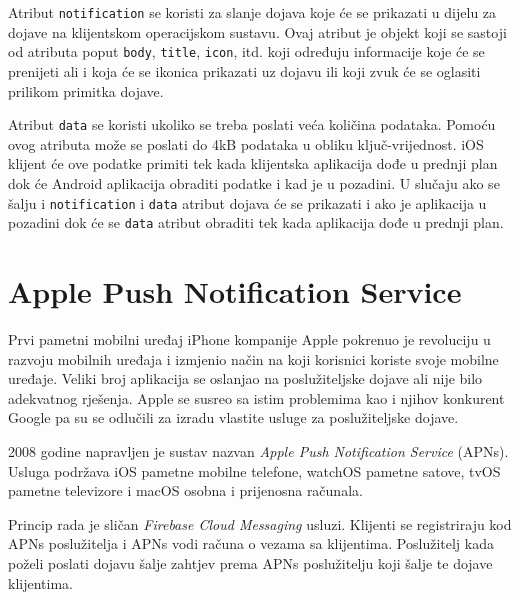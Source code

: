\documentclass[times, utf8, zavrsni]{fer}
\begin{document}
{Atribut {\tt notification} se koristi za slanje dojava koje će se prikazati u dijelu za dojave na klijentskom operacijskom sustavu. Ovaj atribut je objekt koji se sastoji od atributa poput {\tt body}, {\tt title}, {\tt icon}, itd. koji određuju informacije koje će se prenijeti ali i koja će se ikonica prikazati uz dojavu ili koji zvuk će se oglasiti prilikom primitka dojave.

Atribut {\tt data} se koristi ukoliko se treba poslati veća količina podataka. Pomoću ovog atributa može se poslati do 4kB podataka u obliku ključ-vrijednost. iOS klijent će ove podatke primiti tek kada klijentska aplikacija dođe u prednji plan dok će Android aplikacija obraditi podatke i kad je u pozadini. U slučaju ako se šalju i {\tt notification} i {\tt data} atribut dojava će se prikazati i ako je aplikacija u pozadini dok će se {\tt data} atribut obraditi tek kada aplikacija dođe u prednji plan.\citep{fcm2017}

\section{Apple Push Notification Service}

Prvi pametni mobilni uređaj iPhone kompanije Apple pokrenuo je revoluciju u razvoju mobilnih uređaja i izmjenio način na koji korisnici koriste svoje mobilne uređaje. Veliki broj aplikacija se oslanjao na poslužiteljske dojave ali nije bilo adekvatnog rješenja. Apple se susreo sa istim problemima kao i njihov konkurent Google pa su se odlučili za izradu vlastite usluge za poslužiteljske dojave.

2008 godine napravljen je sustav nazvan {\em Apple Push Notification Service} (APNs). Usluga podržava iOS pametne mobilne telefone, watchOS pametne satove, tvOS pametne televizore i macOS osobna i prijenosna računala.

Princip rada je sličan {\em Firebase Cloud Messaging} usluzi. Klijenti se registriraju kod APNs poslužitelja i APNs vodi računa o vezama sa klijentima. Poslužitelj kada poželi poslati dojavu šalje zahtjev prema APNs poslužitelju koji šalje te dojave klijentima.

}
\end{document}
